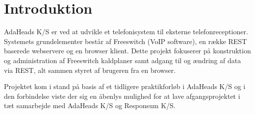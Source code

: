 \chapter*{Introduktion}

AdaHeads K/S er ved at udvikle et telefonisystem til eksterne telefonreceptioner. Systemets grundelementer består af Freeswitch (VoIP software), en række REST baserede webservere og en browser klient.
Dette projekt fokuserer på konstruktion og administration af Freeswitch kaldplaner samt adgang til og ændring af data via REST, alt sammen styret af brugeren fra en browser.

Projektet kom i stand på basis af et tidligere praktikforløb i AdaHeads K/S og i den forbindelse viste der sig en åbenlys mulighed for at lave afgangsprojektet i tæt samarbejde med AdaHeads K/S og Responsum K/S.
